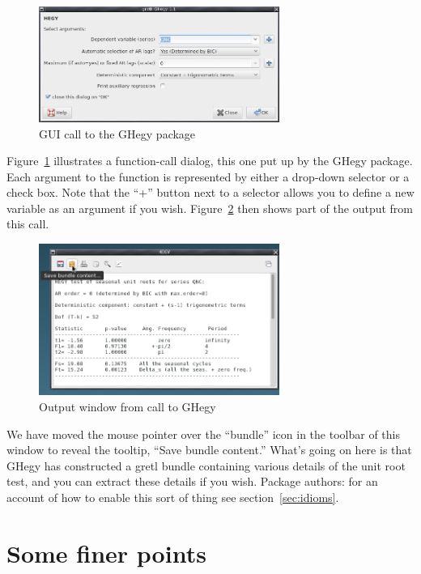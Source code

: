 \documentclass[oneside]{book}
\begin{document}
\begin{figure}[htbp]
  \centering
  \includegraphics[width=0.7\textwidth]{figures/ghegy-call}
  \caption{GUI call to the \textsf{GHegy} package}
  \label{fig:ghegy-call}
\end{figure}

Figure~\ref{fig:ghegy-call} illustrates a function-call dialog, this
one put up by the \textsf{GHegy} package. Each argument to the
function is represented by either a drop-down selector or a check
box. Note that the ``\textsf{+}'' button next to a selector allows you
to define a new variable as an argument if you
wish. Figure~\ref{fig:ghegy-output} then shows part of the output from
this call.

\begin{figure}[htbp]
  \centering
  \includegraphics[width=0.7\textwidth]{figures/ghegy-output}
  \caption{Output window from call to \textsf{GHegy}}
  \label{fig:ghegy-output}
\end{figure}

We have moved the mouse pointer over the ``bundle'' icon in the
toolbar of this window to reveal the tooltip, ``Save bundle content.''
What's going on here is that \textsf{GHegy} has constructed a gretl
bundle containing various details of the unit root test, and you can
extract these details if you wish. Package authors: for an account of
how to enable this sort of thing see section~\ref{sec:idioms}.


\section{Some finer points}
\label{sec:finer}
\end{document}
